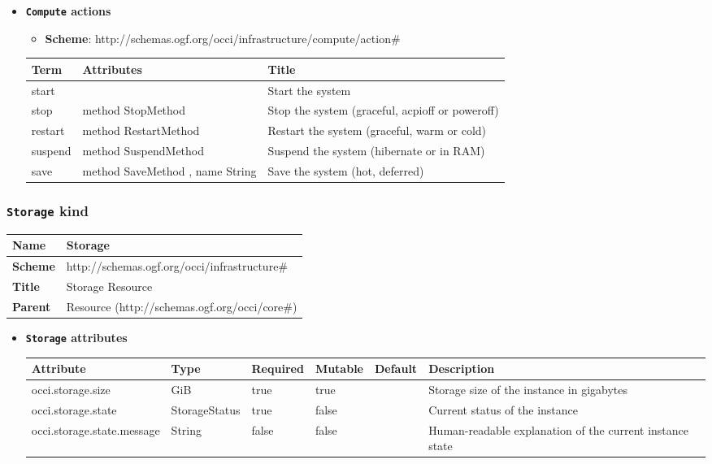 \begin{itemize}
\item \textbf{\texttt{Compute} actions}

\begin{itemize}
	\item \textbf{Scheme}: http://schemas.ogf.org/occi/infrastructure/compute/action\#
\end{itemize}
\begin{tabularx}{\textwidth}{|l|l|X|}
  \hline
  \textbf{Term}  & \textbf{Attributes} & \textbf{Title} \\
  \hline  
  start & & Start the system \\
  \hline
  stop &  method StopMethod & Stop the system (graceful, acpioff or poweroff) \\
  \hline
  restart &  method RestartMethod & Restart the system (graceful, warm or cold) \\
  \hline
  suspend &  method SuspendMethod & Suspend the system (hibernate or in RAM) \\
  \hline
  save &  method SaveMethod , name String & Save the system (hot, deferred) \\
  \hline
\end{tabularx}
\end{itemize}

\subsubsection{\texttt{Storage} kind}
\begin{center}
\begin{tabular}{|l|l|}
  \hline
  \textbf{Name} & Storage \\
  \hline  
  \textbf{Scheme} & http://schemas.ogf.org/occi/infrastructure\# \\
  \hline
  \textbf{Title} & Storage Resource \\
  \hline
  \textbf{Parent} & Resource (http://schemas.ogf.org/occi/core\#) \\
  \hline
\end{tabular}
\end{center}
\begin{itemize}
\item \textbf{\texttt{Storage} attributes}

\begin{tabularx}{\textwidth}{|l|l|p{1.4cm}|p{1.3cm}|l|X|}
  \hline
  \textbf{Attribute} & \textbf{Type} & \textbf{Required} & \textbf{Mutable} & \textbf{Default} & \textbf{Description} \\
  \hline  
  occi.storage.size & GiB & true & true &  & Storage size of the instance in gigabytes \\
  \hline
  occi.storage.state & StorageStatus & true & false &  & Current status of the instance \\
  \hline
  occi.storage.state.message & String & false & false &  & Human-readable explanation of the current instance state \\
  \hline
\end{tabularx}
\end{itemize}

